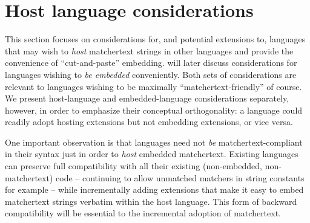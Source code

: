 \section{Host language considerations}
\label{sec:host}

This section focuses on considerations for,
and potential extensions to,
languages that may wish to \emph{host}
matchertext strings in other languages
and provide the convenience of ``cut-and-paste'' embedding.
 will later discuss considerations
for languages wishing to \emph{be embedded} conveniently.
Both sets of considerations are relevant
to languages wishing to be maximally ``matchertext-friendly'' of course.
We present host-language and embedded-language considerations separately,
however,
in order to emphasize their conceptual orthogonality:
a language could readily adopt hosting extensions but not embedding extensions,
or vice versa.

One important observation is that
languages need not \emph{be} matchertext-compliant in their syntax
just in order to \emph{host} embedded matchertext.
Existing languages can preserve full compatibility
with all their existing (non-embedded, non-matchertext) code --
continuing to allow unmatched matchers in string constants for example --
while incrementally adding extensions that make it easy
to embed matchertext strings verbatim within the host language.
This form of backward compatibility will be essential
to the incremental adoption of matchertext.

